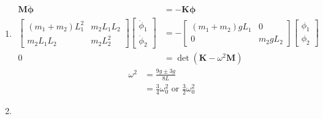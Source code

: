 \documentclass{article}
\renewcommand{\vec}[1]{\boldsymbol{\mathbf{#1}}}
\newcommand{\ddvec}[1]{\ddot{\vec{#1}}}
\begin{document}
\begin{enumerate}
  \item

        \begin{align*}
          \vec{M} \ddvec{\phi}               & = -\vec{K} \vec{\phi}               \\
          \begin{bmatrix}
            (m_1 + m_2) L_1^2 & m_2 L_1 L_2 \\
            m_2 L_1 L_2       & m_2 L_2^2
          \end{bmatrix} \begin{bmatrix}
                          \ddot{\phi}_1 \\
                          \ddot{\phi}_2
                        \end{bmatrix} & = -\begin{bmatrix}
                                             (m_1 + m_2) g L_1 & 0         \\
                                             0                 & m_2 g L_2
                                           \end{bmatrix} \begin{bmatrix}
                                                           \phi_1 \\
                                                           \phi_2
                                                         \end{bmatrix}           \\
          0                                  & = \det (\vec{K} - \omega^2 \vec{M})
        \end{align*}
        \begin{align*}
          \omega^2 & = \frac{9 g \pm 3 g}{8 L}                                   \\
                   & = \frac{3}{4} \omega_0^2 \text{ or } \frac{3}{2} \omega_0^2
        \end{align*}

  \item


\end{enumerate}
\end{document}
